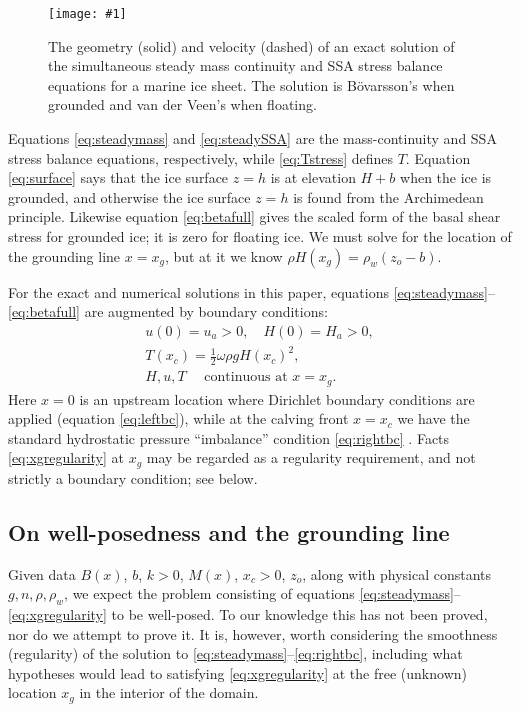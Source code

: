 \documentclass[review,letterpaper]{igs}
\renewcommand{\dh}{\fontencoding{T1}\selectfont{\symbol{240}}}
\newcommand{\onecol}[1]{\texttt{[image: \#1]}}
\newcommand{\bod}{B\"o\dh varsson\xspace}
\begin{document}
\begin{figure}[ht]
\onecol{em-geometry}
\caption{The geometry (solid) and velocity (dashed) of an exact solution of the simultaneous steady mass continuity and SSA stress balance equations for a marine ice sheet.  The solution is \bod's when grounded and van der Veen's when floating.} \label{fig:exactmarine}
\end{figure}

Equations \eqref{eq:steadymass} and \eqref{eq:steadySSA} are the mass-continuity and SSA stress balance equations, respectively, while \eqref{eq:Tstress} defines $T$.  Equation \eqref{eq:surface} says that the ice surface $z=h$ is at elevation $H+b$ when the ice is grounded, and otherwise the ice surface $z=h$ is found from the Archimedean principle.  Likewise equation \eqref{eq:betafull} gives the scaled form of the basal shear stress for grounded ice; it is zero for floating ice.  We must solve for the location of the grounding line $x=x_g$, but at it we know $\rho H(x_g) = \rho_w (z_o - b)$.

For the exact and numerical solutions in this paper, equations \eqref{eq:steadymass}--\eqref{eq:betafull} are augmented by boundary conditions:
\begin{gather}
u(0) = u_a > 0, \quad H(0) = H_a > 0, \label{eq:leftbc} \\
T(x_c) = \frac{1}{2} \omega \rho g H(x_c)^2,  \label{eq:rightbc} \\
H, u, T \quad \text{ continuous at } x = x_g.  \label{eq:xgregularity}
\end{gather}
Here $x=0$ is an upstream location where Dirichlet boundary conditions are applied (equation \eqref{eq:leftbc}), while at the calving front $x=x_c$ we have the standard hydrostatic pressure ``imbalance'' condition \eqref{eq:rightbc} \citep{SchoofMarine1}.  Facts \eqref{eq:xgregularity} at $x_g$ may be regarded as a regularity requirement, and not strictly a boundary condition; see below.

\subsection*{On well-posedness and the grounding line}  Given data $B(x)$, $b$, $k>0$, $M(x)$, $x_c>0$, $z_o$, along with physical constants $g,n,\rho,\rho_w$, we expect the problem consisting of equations \eqref{eq:steadymass}--\eqref{eq:xgregularity} to be well-posed.  To our knowledge this has not been proved, nor do we attempt to prove it.  It is, however, worth considering the smoothness (regularity) of the solution to \eqref{eq:steadymass}--\eqref{eq:rightbc}, including what hypotheses would lead to satisfying \eqref{eq:xgregularity} at the free (unknown) location $x_g$ in the interior of the domain.
\end{document}
